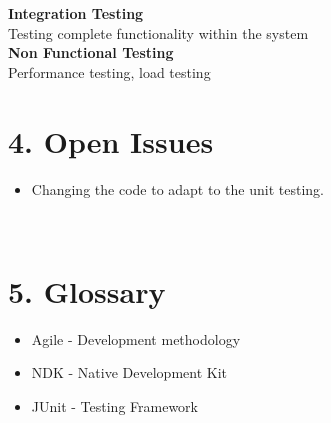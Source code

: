 \documentclass[29pt,a4paper]{moderncv}
\begin{document}
	\vspace{5mm}
	
	\noindent\textbf{Integration Testing} \\
	Testing complete functionality within the system\\
	
	\noindent\textbf{Non Functional Testing}\\
	Performance testing, load testing\\
	
		\section*{4. Open Issues}	
		\begin{itemize}
			\item Changing the code to adapt to the unit testing.	\\
		\end{itemize} \\

		\section*{5. Glossary}
		\begin{itemize}
			\item Agile - Development methodology
			\item NDK - Native Development Kit
			\item JUnit - Testing Framework
		\end{itemize}
\end{document}
